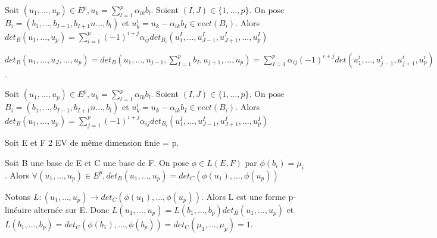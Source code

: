 \documentclass[french]{yLectureNote}
\begin{document}
\begin{proposition}
Soit \((u_1,\dots, u_p)\in E^p, u_k = \sum^p_{l=1}\alpha_{lk}b_l\). Soient \((I,J)\in \{1,\dots, p\}\). On pose \(B_i = (b_1,\dots,b_{I-1},b_{I+1}n\dots, b_l)\) et \(u_k^i = u_k-\alpha_{ik}b_I\in vect(B_i)\). Alors \(det_B(u_1,\dots, u_p) = \sum_{i=1}^p (-1)^{i+j}\alpha_{ij}det_{B_i}(u_1^I,\dots, u_{J-1}^I, u_{J+1}^I,\dots, u_p^I)\)
\end{proposition}
\begin{myproof}
 \(det_B(u_1,\dots, u_J,\dots, u_p) = det_B(u_1,\dots, u_{j-1}, \sum_{I=1}^p b_I, u_{j+1},\dots, u_p) = \sum^p_{I=1}\alpha_{ij}(-1)^{i+j}det(u_1^i, \dots, u_{j-1}^i, u_{j+1}^i, u_p^i)\).
\end{myproof}
\begin{proposition}
Soit \((u_1,\dots, u_p)\in E^p, u_k = \sum^p_{l=1}\alpha_{lk}b_l\). Soient \((I,J)\in \{1,\dots, p\}\). On pose \(B_i = (b_1,\dots,b_{I-1},b_{I+1}n\dots, b_l)\) et \(u_k^i = u_k-\alpha_{ik}b_I\in vect(B_i)\). Alors \(det_B(u_1,\dots, u_p) = \sum_{j=1}^p (-1)^{i+j}\alpha_{ij}det_{B_i}(u_1^I,\dots, u_{J-1}^I, u_{J+1}^I,\dots, u_p^I)\)
\end{proposition}
\begin{proposition}
Soit E et F 2 EV de m\^eme dimension finie = p.

Soit B une base de E et C une base de F. On pose \(\phi\in L(E,F)\) par \(\phi(b_i) = \mu_i\). Alors \(\forall (u_1,\dots, u_p)\in E^p, det_B(u_1,\dots, u_p) = det_C(\phi(u_1),\dots, \phi(u_p))\)
\end{proposition}
\begin{myproof}
 Notons \(L:(u_1,\dots, u_p)\to det_C(\phi(u_1),\dots,\phi(u_p))\). Alors L est une forme p-linéaire alternée sur E. Donc \(L(u_1,\dots, u_p) = L(b_1,\dots, b_p)det_B(u_1,\dots, u_p)\) et \(L(b_1,\dots, b_p) = det_C(\phi(b_1),\dots, \phi(b_p)) = det_C(\mu_1,\dots, \mu_p) = 1\).
\end{myproof}
\end{document}
